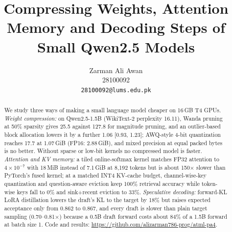 \documentclass{article}
\title{Compressing Weights, Attention Memory and Decoding Steps of Small Qwen2.5 Models}
\author{%
  Zarman Ali Awan \\
  28100092 \\
  \texttt{28100092@lums.edu.pk}
}
\begin{document}
\maketitle
\renewcommand{\arraystretch}{0.8}
\setlength{\textfloatsep}{6pt plus 2pt minus 2pt}
\setlength{\floatsep}{4pt plus 2pt minus 2pt}
\setlength{\intextsep}{4pt plus 2pt minus 2pt}
\setlength{\abovecaptionskip}{3pt}
\setlength{\belowcaptionskip}{2pt}
\setlength{\tabcolsep}{3.5pt}

\begin{abstract}
We study three ways of making a small language model cheaper on 16\,GB T4 GPUs. \emph{Weight compression:} on
Qwen2.5-1.5B (WikiText-2 perplexity 16.11), Wanda pruning at 50\% sparsity gives 25.5 against 127.8 for magnitude pruning,
and an outlier-based block allocation lowers it by a further 1.06 [0.93, 1.23]; AWQ-style 4-bit quantization reaches 17.7
at 1.07\,GiB (FP16: 2.88\,GiB), and mixed precision at equal packed bytes is no better. Without sparse or low-bit kernels
no compressed model is faster. \emph{Attention and KV memory:} a tiled online-softmax kernel matches FP32 attention
to $4\times10^{-7}$ with 18\,MiB instead of 7.1\,GiB at 8,192 tokens but is about 150$\times$ slower than PyTorch's fused
kernel; at a matched INT4 KV-cache budget, channel-wise-key quantization and question-aware eviction keep 100\% retrieval accuracy while token-wise
keys fall to 0\% and sink+recent eviction to 33\%. \emph{Speculative decoding:} forward-KL LoRA distillation lowers the
draft's KL to the target by 18\% but raises expected acceptance only from 0.862 to 0.867, and every draft is slower than
plain target sampling (0.70--0.81$\times$) because a 0.5B draft forward costs about 84\% of a 1.5B forward at batch size 1.
Code and results: \url{https://github.com/alizarman786-prog/atml-pa4}.
\end{abstract}

\end{document}
